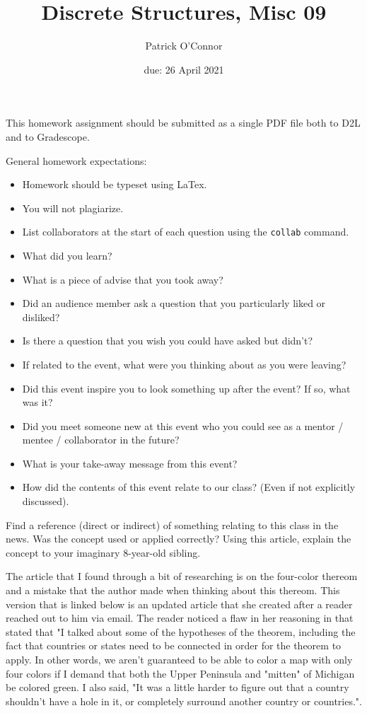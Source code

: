 \documentclass{article}
\title{Discrete Structures, Misc 09}
\author{Patrick O'Connor}
\date{due: 26 April 2021}
\begin{document}
\maketitle

This homework assignment should be
submitted as a single PDF file both to D2L and to Gradescope.

General homework expectations:
\begin{itemize}
    \item Homework should be typeset using LaTex.
    \item You will not plagiarize.
    \item List collaborators at the start of each question using the
        \texttt{collab} command.
    \item What did you learn?
    \item     What is a piece of advise that you took away?
    \item     Did an audience member ask a question that you particularly liked or disliked?
    \item    Is there a question that you wish you could have asked but didn't?
    \item     If related to the event, what were you thinking about as you were leaving?
    \item   Did this event inspire you to look something up after the event? If so, what was it?
    \item    Did you meet someone new at this event who you could see as a mentor / mentee / collaborator in the future?
    \item     What is your take-away message from this event?
    \item    How did the contents of this event relate to our class? (Even if not explicitly discussed).
\end{itemize}


Find a reference (direct or indirect) of something 
relating to this class in the news. Was the concept used or applied correctly? Using this article, 
explain the concept to your imaginary 8-year-old sibling.

The article that I found through a bit of researching is on the four-color thereom and a mistake that the author made when thinking about this 
thereom. This version that is linked below is an updated article that she created after a reader reached out to him via email. The reader 
noticed a flaw in her reasoning in that stated that "I talked about some of the hypotheses of the theorem, including the fact that countries 
or states need to be connected in order for the theorem to apply. In other words, we aren't guaranteed to be able to color a map with only 
four colors if I demand that both the Upper Peninsula and "mitten" of Michigan be colored green. I also said, "It was a little harder to 
figure out that a country shouldn’t have a hole in it, or completely surround another country or countries.". 
\end{document}
